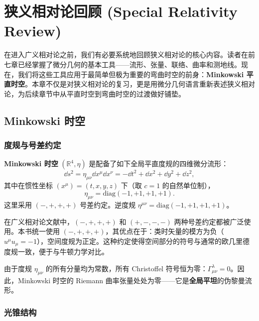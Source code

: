 \chapter{狭义相对论回顾 (Special Relativity Review)}
\label{chap:sr}

在进入广义相对论之前，我们有必要系统地回顾狭义相对论的核心内容。读者在前七章已经掌握了微分几何的基本工具——流形、张量、联络、曲率和测地线。现在，我们将这些工具应用于最简单但极为重要的弯曲时空的前身：\textbf{Minkowski 平直时空}。本章不仅是对狭义相对论的复习，更是用微分几何语言重新表述狭义相对论，为后续章节中从平直时空到弯曲时空的过渡做好铺垫。

\section{Minkowski 时空}

\subsection{度规与号差约定}

\begin{definition}[Minkowski 度规]
\textbf{Minkowski 时空} $(\mathbb{R}^4, \eta)$ 是配备了如下全局平直度规的四维微分流形：
\begin{equation}\label{eq:minkowski_metric}
    \dd s^2 = \eta_{\mu\nu} \dd x^\mu \dd x^\nu = -\dd t^2 + \dd x^2 + \dd y^2 + \dd z^2,
\end{equation}
其中在惯性坐标 $(x^\mu) = (t, x, y, z)$ 下（取 $c=1$ 的自然单位制），
\begin{equation}
    \eta_{\mu\nu} = \mathrm{diag}(-1, +1, +1, +1).
\end{equation}
这里采用 $(-,+,+,+)$ 号差约定。逆度规 $\eta^{\mu\nu} = \mathrm{diag}(-1, +1, +1, +1)$。
\end{definition}

\begin{note}[号差约定的选择]
在广义相对论文献中，$(-,+,+,+)$ 和 $(+,-,-,-)$ 两种号差约定都被广泛使用。本书统一使用 $(-,+,+,+)$，其优点在于：类时矢量的模方为负（$u^\mu u_\mu = -1$），空间度规为正定。这种约定使得空间部分的符号与通常的欧几里德度规一致，便于与牛顿力学对比。
\end{note}

由于度规 $\eta_{\mu\nu}$ 的所有分量均为常数，所有 Christoffel 符号恒为零：$\Gamma^\lambda_{\mu\nu} = 0$。因此，Minkowski 时空的 Riemann 曲率张量处处为零——它是\textbf{全局平坦}的伪黎曼流形。

\subsection{光锥结构}

